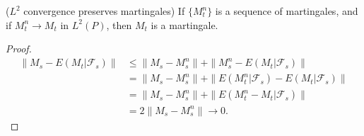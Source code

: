 
\begin{lemma}
	($L^2$ convergence preserves martingales) If $\{M_t^n\} $ is a sequence of martingales, and if $M_t^n \to M_t$ in $L^2(P)$, then $M_t$ is a martingale.
\end{lemma}
\begin{proof}
	\begin{align*}
		\|M_s - E\left( M_t | \mathcal{F}_s \right) \|
		&\leq \|M_s - M_s^n\| + \|M_s^n - E\left( M_t | \mathcal{F}_s \right) \| \\
		&= \|M_s - M_s^n\| + \|E\left( M_t^n | \mathcal{F}_s \right)  - E\left( M_t | \mathcal{F}_s \right) \| \\
		&= \|M_s - M_s^n\| + \|E\left( M_t^n - M_t | \mathcal{F}_s \right) \| \\
		&= 2\|M_s - M_s^n\| \to 0
	.\end{align*}
\end{proof}

